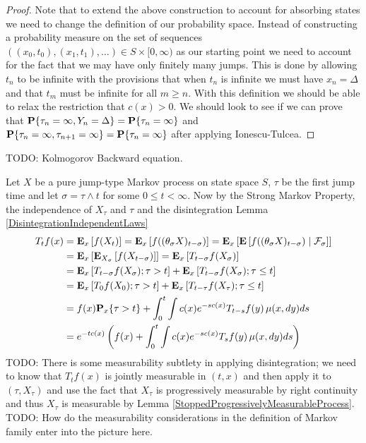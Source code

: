 \begin{proof}
Note that to extend the above construction to account for absorbing states we need to change the definition of our probability space.
Instead of constructing a probability measure on the set of sequences $((x_0, t_0), (x_1, t_1), \dotsc) \in S \times [0,\infty)$ as our starting point
we need to account for the fact that we may have only finitely many jumps.  This is done by allowing $t_n$ to be infinite with the provisions that
when $t_n$ is infinite we must have $x_n = \Delta$ and that $t_{m}$ must be infinite for all $m \geq n$.  With this definition we should be able to relax
the restriction that $c(x) > 0$.  We should look to see if we can prove that $\probability {\tau_n = \infty, Y_n = \Delta} = \probability{\tau_n = \infty}$ and
$\probability {\tau_n = \infty, \tau_{n+1} = \infty} = \probability{\tau_n = \infty}$ after applying Ionescu-Tulcea.
\end{proof}

TODO: Kolmogorov Backward equation.

Let $X$ be a pure jump-type Markov process on state space $S$, $\tau$
be the first jump time and let $\sigma = \tau \wedge t$ for some $0
\leq t < \infty$.  Now by the Strong Markov Property, the independence
of $X_\tau$ and $\tau$ and the disintegration Lemma \ref{DisintegrationIndependentLaws}
\begin{align*}
T_tf(x) 
&=\sexpectation{f(X_t)}{x} 
=\sexpectation{f((\theta_\sigma X)_{t - \sigma})}{x} 
=\sexpectation{\cexpectationlong{\mathcal{F}_\sigma}{f((\theta_\sigma  X)_{t - \sigma})}}{x} \\
&=\sexpectation{\sexpectation{f(X_{t - \sigma})}{X_\sigma}}{x} 
=\sexpectation{T_{t - \sigma}f(X_\sigma)}{x} \\
&=\sexpectation{T_{t - \sigma}f(X_\sigma) ; \tau > t}{x} +
  \sexpectation{T_{t - \sigma}f(X_\sigma); \tau \leq t}{x} \\
&= \sexpectation{T_{0}f(X_0) ; \tau > t}{x}  +
  \sexpectation{T_{t - \tau}f(X_\tau); \tau \leq t}{x} \\
&=f(x) \sprobability{\tau > t}{x} +  \int_0^t \int c(x) e^{-sc(x)} T_{t - s}f(y) \,  \mu(x, dy) ds \\
&=e^{-tc(x)}   \left( f(x) +  \int_0^t \int c(x) e^{-sc(x)} T_{s}f(y) \,  \mu(x, dy) ds \right )\\
\end{align*}
TODO: There is some measurability subtlety in applying disintegration; we need to know that $T_tf(x)$ is jointly measurable in $(t,x)$
and then apply it to $(\tau, X_\tau)$ and use the fact that $X_\tau$ is progressively measurable by right continuity and thus $X_\tau$ is measurable
by Lemma \ref{StoppedProgressivelyMeasurableProcess}.  TODO: How do the measurability considerations in the definition of Markov family enter into the picture here.

